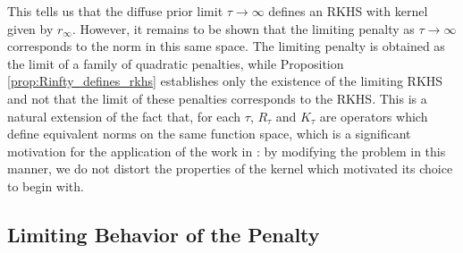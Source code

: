 \documentclass[ejsv2,preprint]{imsart}
\begin{document}
This tells us that the diffuse prior limit $\tau\to\infty$ defines an RKHS with kernel given by $r_{\infty}$. However, it remains to be shown that the limiting penalty as $\tau \to \infty$ corresponds to the norm in this same space. The limiting penalty is obtained as the limit of a family of quadratic penalties, while Proposition \ref{prop:Rinfty_defines_rkhs} establishes only the existence of the limiting RKHS and not that the limit of these penalties corresponds to the RKHS. This is a natural extension of the fact that, for each $\tau$, $R_\tau$ and $K_\tau$ are operators which define equivalent norms on the same function space, which is a significant motivation for the application of the work in \cite{pmlr-v54-flaxman17a}: by modifying the problem in this manner, we do not distort the properties of the kernel which motivated its choice to begin with.

\subsection{Limiting Behavior of the Penalty}
\end{document}
